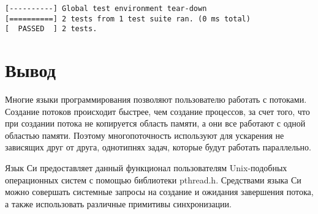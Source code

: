 \documentclass[pdf, unicode, 12pt, a4paper,oneside,fleqn]{article}
\begin{document}
\begin{verbatim}
[----------] Global test environment tear-down
[==========] 2 tests from 1 test suite ran. (0 ms total)
[  PASSED  ] 2 tests.

\end{verbatim}

\pagebreak

\section{Вывод}

Многие языки программирования позволяют пользователю работать с потоками. 
Создание потоков происходит быстрее, чем создание процессов, за счет того, что
при создании потока не копируется область памяти, а они все работают с одной
областью памяти. Поэтому многопоточность используют для ускарения не зависящих
друг от друга, однотипнях задач, которые будут работать параллельно.

Язык Си предоставляет данный функционал пользователям Unix-подобных операционных
систем с помощью библиотеки pthread.h. Средствами языка Си можно совершать системные
запросы на создание и ожидания завершения потока, а также использовать различные
примитивы синхронизации.
\end{document}
